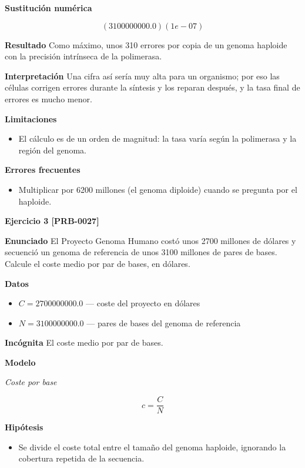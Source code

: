 \documentclass{book}
\begin{document}
\noindent\textbf{Sustitución numérica}

\[
\left(3100000000.0\right) \left(1e-07\right)
\]

\noindent\textbf{Resultado}
Como máximo, unos 310 errores por copia de un genoma haploide con la precisión intrínseca de la polimerasa.


\noindent\textbf{Interpretación}
Una cifra así sería muy alta para un organismo; por eso las células corrigen errores durante la síntesis y los reparan después, y la tasa final de errores es mucho menor.


\noindent\textbf{Limitaciones}
\begin{itemize}
\item El cálculo es de un orden de magnitud: la tasa varía según la polimerasa y la región del genoma.
\end{itemize}

\noindent\textbf{Errores frecuentes}
\begin{itemize}
\item Multiplicar por 6200 millones (el genoma diploide) cuando se pregunta por el haploide.
\end{itemize}

\noindent\textbf{Ejercicio 3 [PRB-0027]}

\noindent\textbf{Enunciado}
El Proyecto Genoma Humano costó unos 2700 millones de dólares y secuenció un genoma de referencia de unos 3100 millones de pares de bases. Calcule el coste medio por par de bases, en dólares.


\noindent\textbf{Datos}
\begin{itemize}
\item $C = 2700000000.0$ — coste del proyecto en dólares
\item $N = 3100000000.0$ — pares de bases del genoma de referencia
\end{itemize}

\noindent\textbf{Incógnita}
El coste medio por par de bases.


\noindent\textbf{Modelo}

\noindent\textit{Coste por base}

\[
c = \frac{C}{N}
\]

\noindent\textbf{Hipótesis}
\begin{itemize}
\item Se divide el coste total entre el tamaño del genoma haploide, ignorando la cobertura repetida de la secuencia.
\end{itemize}
\end{document}

